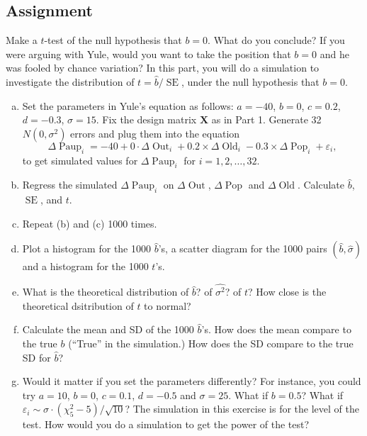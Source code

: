 \documentclass{amsart}
\DeclareMathOperator{\SE}{\text{SE}}
\DeclareMathOperator{\Paup}{\text{Paup}}
\DeclareMathOperator{\Out}{\text{Out}}
\DeclareMathOperator{\Old}{\text{Old}}
\DeclareMathOperator{\Pop}{\text{Pop}}
\newcommand{\ep}{\varepsilon}
\begin{document}
		\subsection{Assignment} %
		\label{sub:assignment2}
			Make a $t$-test of the null hypothesis that $b = 0$. 
			What do you conclude? 
			If you were arguing with Yule, would you want to take the position that $b = 0$ and he was fooled by chance variation?
			In this part, you will do a simulation to investigate the distribution of $t = \hat{b}/\SE$, under the null hypothesis that $b = 0$.
			\begin{enumerate}[(a)]
				\item Set the parameters in Yule's equation as follows: $a = -40$, $b = 0$, $c = 0.2$, $d = -0.3$, $\sigma = 15$. 
				Fix the design matrix $\mathbf{X}$ as in Part 1. 
				Generate 32 $N(0,\sigma^{2})$ errors and plug them into the equation
				$$\Delta \Paup_{i} = -40 + 0 \cdot \Delta \Out_{i} +0.2 \times \Delta \Old_{i} -0.3 \times \Delta \Pop_{i} + \ep_{i},$$
				to get simulated values for $\Delta \Paup_{i}$ for $i = 1,2,\dots,32$.
				\item  Regress the simulated $\Delta \Paup_{i}$ on $\Delta \Out$, $\Delta \Pop$ and $\Delta \Old$. 
				Calculate $\hat{b}$, $\SE$, and $t$.
				\item  Repeat (b) and (c) 1000 times.
				\item  Plot a histogram for the 1000 $\hat{b}$'s, a scatter diagram for the 1000 pairs $(\hat{b},\hat{\sigma})$ and a histogram for the 1000 $t$'s.
				\item  What is the theoretical distribution of $\hat{b}$? of $\hat{\sigma^{2}}$? of $t$? 
				How close is the theoretical dsitribution of $t$ to normal?
				\item  Calculate the mean and SD of the 1000 $\hat{b}$'s. 
				How does the mean compare to the true $b$ (``True'' in the simulation.) 
				How does the SD compare to the true SD for $\hat{b}$?
				\item Would it matter if you set the parameters differently? 
				For instance, you could try $a = 10$, $b = 0$, $c = 0.1$, $d = -0.5$ and $\sigma = 25$. What if $b = 0.5$? 
				What if $\ep_{i} \sim \sigma \cdot \left( \chi_{5}^{2} - 5 \right)/\sqrt{10}$?
				The simulation in this exercise is for the level of the test. 
				How would you do a simulation to get the power of the test?
			\end{enumerate}
\end{document}

